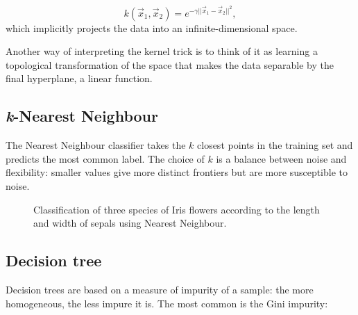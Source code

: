 \[k(\vec{x}_1, \vec{x}_2) = e^{-\gamma ||\vec{x}_1 - \vec{x}_2||^2 },\]
which implicitly projects the data into an infinite-dimensional space.

Another way of interpreting the kernel trick is to think of it as learning a topological transformation of the space that makes the data separable by the final hyperplane, a linear function.

\subsection{\emph{k}-Nearest Neighbour}
The Nearest Neighbour classifier takes the $k$ closest points in the training set and predicts the most common label.
The choice of $k$ is a balance between noise and flexibility: smaller values give more distinct frontiers but are more susceptible to noise.

\begin{figure}[htb]
	\centering
	\hfill
	\caption{Classification of three species of Iris flowers according to the length and width of sepals using Nearest Neighbour.}\label{fig:knn}
\end{figure}

\subsection{Decision tree}\label{sec:decision_tree}
Decision trees are based on a measure of impurity of a sample: the more homogeneous, the less impure it is.
The most common is the Gini impurity:

